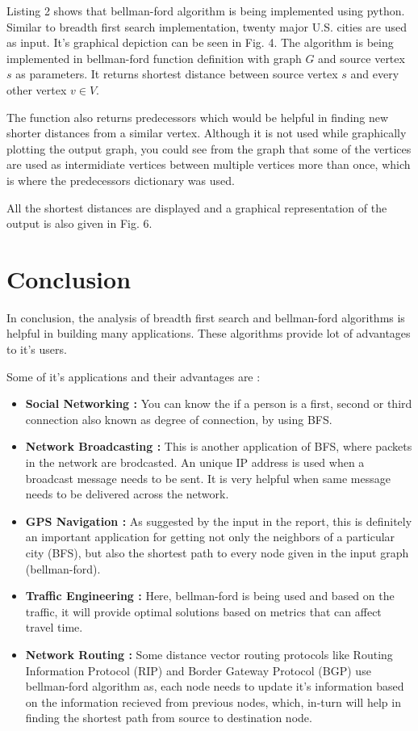 \documentclass[lettersize,journal]{IEEEtran}
\begin{document}
Listing 2 shows that bellman-ford algorithm is being implemented using python. Similar to breadth first search implementation, twenty major U.S. cities are used as input. It's graphical depiction can be seen in Fig. 4. The algorithm is being implemented in bellman-ford function definition with graph \(G\) and source vertex \(s\) as parameters.  It returns shortest distance between source vertex \(s\) and every other vertex \(v \in V\). 

The function also returns predecessors which would be helpful in finding new shorter distances from a similar vertex. Although it is not used while graphically plotting the output graph, you could see from the graph that some of the vertices are used as intermidiate vertices between multiple vertices more than once, which is where the predecessors dictionary was used. 

All the shortest distances are displayed and a graphical representation of the output is also given in Fig. 6.

\section{Conclusion}
In conclusion, the analysis of breadth first search and bellman-ford algorithms is helpful in building many applications. These algorithms provide lot of advantages to it's users. 

Some of it's applications and their advantages are :

\begin{itemize}
    \item {\textbf{Social Networking :} You can know the if a person is a first, second or third connection also known as degree of connection, by using BFS.} \cite{bfs_applications_gfg}
    \item {\textbf{Network Broadcasting :} This is another application of BFS, where packets in the network are brodcasted. An unique IP address is used when a broadcast message needs to be sent. It is very helpful when same message needs to be delivered across the network.} \cite{bfs_applications_gfg}
    \item {\textbf{GPS Navigation :} As suggested by the input in the report, this is definitely an important application for getting not only the neighbors of a particular city (BFS), but also the shortest path to every node given in the input graph (bellman-ford).} \cite{bfs_applications_gfg}
    \item {\textbf{Traffic Engineering :} Here, bellman-ford is being used and based on the traffic, it will provide optimal solutions based on metrics that can affect travel time.} \cite{ChatGPT}
    \item {\textbf{Network Routing :} Some distance vector routing protocols like Routing Information Protocol (RIP) and Border Gateway Protocol (BGP) use bellman-ford algorithm as, each node needs to update it's information based on the information recieved from previous nodes, which, in-turn will help in finding the shortest path from source to destination node.} \cite{ChatGPT}
\end{itemize}




\end{document}
